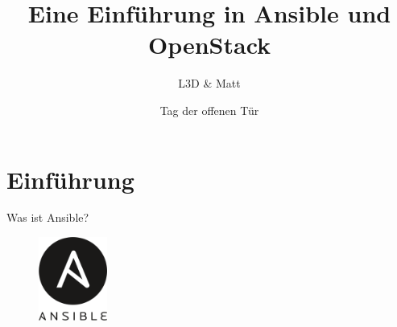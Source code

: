 \documentclass[aspectratio=169]{beamer}
\title{Eine Einführung in Ansible und OpenStack}
\author{L3D \& Matt}
\institute[Toolbox Bodensee]
\date{Tag der offenen Tür \the\year}
\begin{document}
\begin{frame}
  \titlepage
\end{frame}

\section{Einführung} 
\begin{frame}{Was ist Ansible?}
    \begin{figure}
        \centering
        \includegraphics[width=0.2\textwidth]{832px-Ansible_logo.png}
    \end{figure} 
\end{frame}
\end{document}
